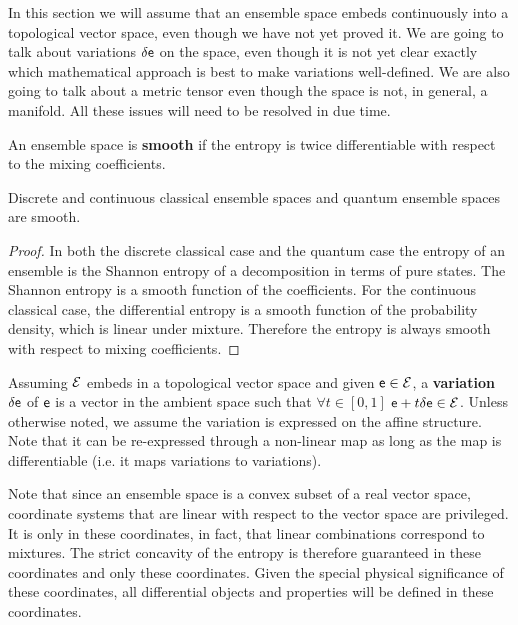 \begin{mathSection}
\begin{remark}
	In this section we will assume that an ensemble space embeds continuously into a topological vector space, even though we have not yet proved it. We are going to talk about variations $\delta \mathsf{e}$ on the space, even though it is not yet clear exactly which mathematical approach is best to make variations well-defined. We are also going to talk about a metric tensor even though the space is not, in general, a manifold. All these issues will need to be resolved in due time.
\end{remark}
	
\begin{defn}
	An ensemble space is \textbf{smooth} if the entropy is twice differentiable with respect to the mixing coefficients.
\end{defn}

\begin{prop}
	Discrete and continuous classical ensemble spaces and quantum ensemble spaces are smooth.
\end{prop}

\begin{proof}
	In both the discrete classical case and the quantum case the entropy of an ensemble is the Shannon entropy of a decomposition in terms of pure states. The Shannon entropy is a smooth function of the coefficients. For the continuous classical case, the differential entropy is a smooth function of the probability density, which is linear under mixture. Therefore the entropy is always smooth with respect to mixing coefficients.
\end{proof}

\begin{defn}
	Assuming $\mathcal{E}$ embeds in a topological vector space and given $\mathsf{e} \in \mathcal{E}$, a \textbf{variation} $\delta \mathsf{e}$ of $\mathsf{e}$ is a vector in the ambient space such that $\forall t \in [0,1]$ $\mathsf{e} + t \delta \mathsf{e} \in \mathcal{E}$. Unless otherwise noted, we assume the variation is expressed on the affine structure. Note that it can be re-expressed through a non-linear map as long as the map is differentiable (i.e. it maps variations to variations).
\end{defn}

\begin{remark}
	Note that since an ensemble space is a convex subset of a real vector space, coordinate systems that are linear with respect to the vector space are privileged. It is only in these coordinates, in fact, that linear combinations correspond to mixtures. The strict concavity of the entropy is therefore guaranteed in these coordinates and only these coordinates. Given the special physical significance of these coordinates, all differential objects and properties will be defined in these coordinates.
\end{remark}


\end{mathSection}
